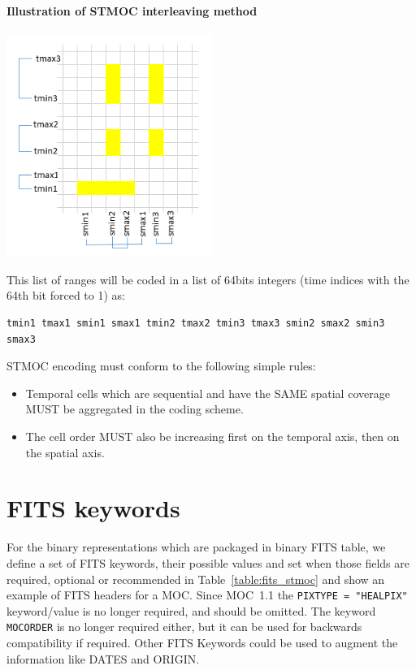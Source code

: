 \documentclass[11pt,a4paper]{ivoa}
\begin{document}
\paragraph{Illustration of STMOC interleaving method}
\begin{adjustbox}{center,caption={STMOC encoding with two independent
      numbering system},
    label={fig:stmocbin-encoding},nofloat=figure,vspace=\bigskipamount}
\includegraphics[width=0.5\textwidth]{STMOCbin.png}
\end{adjustbox}

\par\noindent
This list of ranges will be  coded in a list of 64bits integers
(time indices with the 64th bit forced to 1) as:
\begin{lstlisting}[]
   tmin1 tmax1 smin1 smax1 tmin2 tmax2 tmin3 tmax3 smin2 smax2 smin3 smax3
\end{lstlisting}

STMOC encoding must conform to the following simple rules:
\begin{itemize}
\item{Temporal cells which are sequential and have the SAME
  spatial coverage MUST be aggregated in the coding scheme.}
\item{The cell order MUST also be increasing first on the
  temporal axis, then on the spatial axis.}
\end{itemize}


\section{FITS keywords}
\label{sec:fits-key-moc} 
For the binary representations which are packaged in binary FITS table,
we define a set of FITS keywords, their possible values and set when
those fields are required, optional or recommended in
Table~\ref{table:fits_stmoc} and show an example of FITS headers for a MOC.
Since MOC~1.1 \citep{2019ivoa.spec.1007F} the {\tt PIXTYPE = "HEALPIX"}
keyword/value is no longer required, and should be omitted. 
The keyword {\tt MOCORDER} is no longer required either, but it can be used for
backwards compatibility if required.
Other FITS Keywords could be used to augment the information like DATES and ORIGIN. 
 
\end{document}
